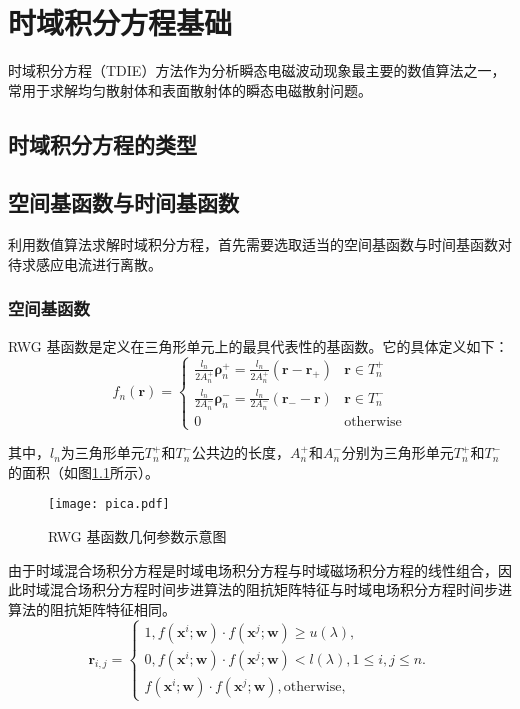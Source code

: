 \chapter{时域积分方程基础}
时域积分方程（TDIE）方法作为分析瞬态电磁波动现象最主要的数值算法之一，常用于求解均匀散射体和表面散射体的瞬态电磁散射问题。

\section{时域积分方程的类型}

\section{空间基函数与时间基函数}
利用数值算法求解时域积分方程，首先需要选取适当的空间基函数与时间基函数对待求感应电流进行离散。

\subsection{空间基函数}
RWG 基函数是定义在三角形单元上的最具代表性的基函数。它的具体定义如下：
\begin{equation}
f_n(\bm{r})=
\begin{cases}
\frac{l_n}{2A_n^+}\bm{\rho}_n^+=\frac{l_n}{2A_n^+}(\bm{r}-\bm{r}_+)&\bm{r}\in T_n^+\\
\frac{l_n}{2A_n^-}\bm{\rho}_n^-=\frac{l_n}{2A_n^-}(\bm{r}_--\bm{r})&\bm{r}\in T_n^-\\
0&\text{otherwise}
\end{cases}
\end{equation}

其中，$l_n$为三角形单元$T_n^+$和$T_n^-$公共边的长度，$A_n^+$和$A_n^-$分别为三角形单元$T_n^+$和$T_n^-$的面积（如图\ref{pica}所示）。

\begin{figure}[h]
	\texttt{[image: pica.pdf]}
	\caption{RWG 基函数几何参数示意图}
	\label{pica}
\end{figure}

由于时域混合场积分方程是时域电场积分方程与时域磁场积分方程的线性组合，因此时域混合场积分方程时间步进算法的阻抗矩阵特征与时域电场积分方程时间步进算法的阻抗矩阵特征相同。
\begin{equation}
\label{latent_binary_variable}
\bm{r}_{i,j}=
\begin{cases}
1,f(\bm{x}^{i};\bm{w})\cdot f(\bm{x}^{j};\bm{w})\geq u(\lambda),\\
0,f(\bm{x}^{i};\bm{w})\cdot f(\bm{x}^{j};\bm{w})< l(\lambda), 1\leq i,j\leq n.\\
f(\bm{x}^{i};\bm{w})\cdot f(\bm{x}^{j};\bm{w}),\text{otherwise},
\end{cases}
\end{equation}

